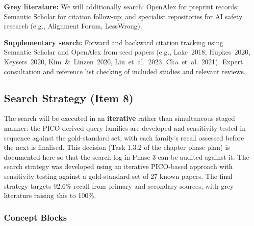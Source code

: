 \textbf{Grey literature:} We will additionally search: OpenAlex for preprint records; Semantic Scholar for citation follow-up; and specialist repositories for AI safety research (e.g., Alignment Forum, LessWrong).

\textbf{Supplementary search:} Forward and backward citation tracking using Semantic Scholar and OpenAlex from seed papers (e.g., \mbox{Lake 2018}, \mbox{Hupkes 2020}, \mbox{Keysers 2020}, \mbox{Kim \& Linzen 2020}, \mbox{Liu et al.~2023}, \mbox{Cha et al.~2021}). Expert consultation and reference list checking of included studies and relevant reviews.

\subsection{Search Strategy (Item 8)}

The search will be executed in an \textbf{iterative} rather than simultaneous staged manner: the PICO-derived query families are developed and sensitivity-tested in sequence against the gold-standard set, with each family's recall assessed before the next is finalised. This decision (Task 1.3.2 of the chapter phase plan) is documented here so that the search log in Phase 3 can be audited against it. The search strategy was developed using an iterative PICO-based approach with sensitivity testing against a gold-standard set of 27 known papers. The final strategy targets 92.6\% recall from primary and secondary sources, with grey literature raising this to 100\%.

\subsubsection{Concept Blocks}

